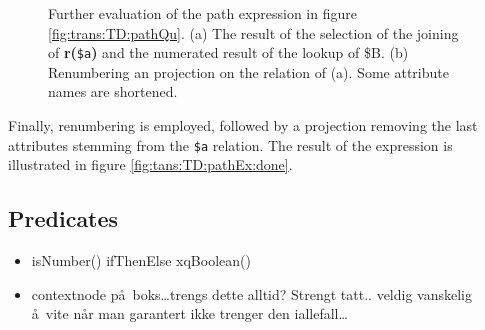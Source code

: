 \begin{myExample}
\begin{figure}[h]
\qquad
{}
\caption[Further evaluation of the path expression]{Further evaluation of the path expression in figure
\ref{fig:trans:TD:pathQu}. (a) The result of the selection of the joining of \textbf{r(}\texttt{\$a}\textbf{)} and
the numerated result of the lookup of \textsf{\$B}. (b) Renumbering an projection on the relation of (a). Some
attribute names are shortened.}
\end{figure}

Finally, renumbering is employed, followed by a projection removing the last attributes stemming from the
\texttt{\$a} relation. The result of the expression is illustrated in figure \ref{fig:tans:TD:pathEx:done}.

\end{myExample}

\subsection{Predicates}
\label{sect:trans:TD:predicates}
\begin{itemize}
  \item isNumber() ifThenElse xqBoolean()
  \item contextnode p\aa~boks\ldots trengs dette alltid? Strengt tatt.. veldig vanskelig \aa~vite n\aa r man
  garantert ikke trenger den iallefall\ldots
\end{itemize}

